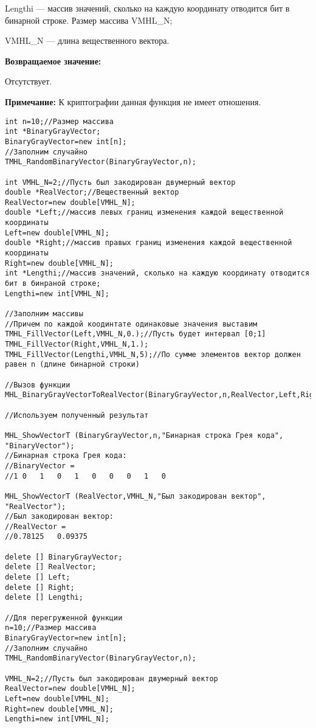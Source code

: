 \documentclass[a4paper,12pt]{article}
\begin{document}
Lengthi --- массив значений, сколько на каждую координату отводится бит в бинарной строке. Размер массива VMHL\_N;
 
VMHL\_N --- длина вещественного вектора.
 
\textbf{Возвращаемое значение:}
 
Отсутствует.

\textbf{Примечание:}
 К криптографии данная функция не имеет отношения.



\begin{lstlisting}[label=code_use_MHL_BinaryGrayVectorToRealVector,caption=Пример использования]
int n=10;//Размер массива
int *BinaryGrayVector;
BinaryGrayVector=new int[n];
//Заполним случайно
TMHL_RandomBinaryVector(BinaryGrayVector,n);

int VMHL_N=2;//Пусть был закодирован двумерный вектор
double *RealVector;//Вещественный вектор
RealVector=new double[VMHL_N];
double *Left;//массив левых границ изменения каждой вещественной координаты
Left=new double[VMHL_N];
double *Right;//массив правых границ изменения каждой вещественной координаты
Right=new double[VMHL_N];
int *Lengthi;//массив значений, сколько на каждую координату отводится бит в бинраной строке;
Lengthi=new int[VMHL_N];

//Заполним массивы
//Причем по каждой коодинтате одинаковые значения выставим
TMHL_FillVector(Left,VMHL_N,0.);//Пусть будет интервал [0;1]
TMHL_FillVector(Right,VMHL_N,1.);
TMHL_FillVector(Lengthi,VMHL_N,5);//По сумме элементов вектор должен равен n (длине бинарной строки)

//Вызов функции
MHL_BinaryGrayVectorToRealVector(BinaryGrayVector,n,RealVector,Left,Right,Lengthi,VMHL_N);

//Используем полученный результат

MHL_ShowVectorT (BinaryGrayVector,n,"Бинарная строка Грея кода", "BinaryVector");
//Бинарная строка Грея кода:
//BinaryVector =
//1	0	1	0	1	0	0	0	1	0

MHL_ShowVectorT (RealVector,VMHL_N,"Был закодирован вектор", "RealVector");
//Был закодирован вектор:
//RealVector =
//0.78125	0.09375

delete [] BinaryGrayVector;
delete [] RealVector;
delete [] Left;
delete [] Right;
delete [] Lengthi;

//Для перегруженной функции
n=10;//Размер массива
BinaryGrayVector=new int[n];
//Заполним случайно
TMHL_RandomBinaryVector(BinaryGrayVector,n);

VMHL_N=2;//Пусть был закодирован двумерный вектор
RealVector=new double[VMHL_N];
Left=new double[VMHL_N];
Right=new double[VMHL_N];
Lengthi=new int[VMHL_N];


\end{lstlisting}
\end{document}
